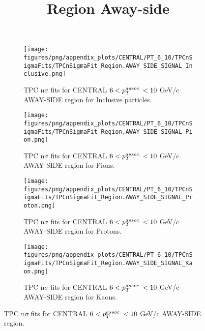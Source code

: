             \begin{figure}[H]
                \title{Region Away-side}
                \begin{subfigure}[b]{0.5\textwidth}
                    \centering
                    \texttt{[image: figures/png/appendix\_plots/CENTRAL/PT\_6\_10/TPCnSigmaFits/TPCnSigmaFit\_Region.AWAY\_SIDE\_SIGNAL\_Inclusive.png]}
                    \caption{TPC n$\sigma$ fits for CENTRAL $6 < \pTassoc < 10$ GeV/c AWAY-SIDE region for Inclusive particles.}
                    \label{fig:appendix_CENTRAL_$6 < \pTassoc < 10$ GeV/c_AWAY_SIDE_SIGNAL_Inclusive}
                \end{subfigure}
                \begin{subfigure}[b]{0.5\textwidth}
                    \centering
                    \texttt{[image: figures/png/appendix\_plots/CENTRAL/PT\_6\_10/TPCnSigmaFits/TPCnSigmaFit\_Region.AWAY\_SIDE\_SIGNAL\_Pion.png]}
                    \caption{TPC n$\sigma$ fits for CENTRAL $6 < \pTassoc < 10$ GeV/c AWAY-SIDE region for Pions.}
                    \label{fig:appendix_CENTRAL_$6 < \pTassoc < 10$ GeV/c_AWAY_SIDE_SIGNAL_Pion}
                \end{subfigure}
                \begin{subfigure}[b]{0.5\textwidth}
                    \centering
                    \texttt{[image: figures/png/appendix\_plots/CENTRAL/PT\_6\_10/TPCnSigmaFits/TPCnSigmaFit\_Region.AWAY\_SIDE\_SIGNAL\_Proton.png]}
                    \caption{TPC n$\sigma$ fits for CENTRAL $6 < \pTassoc < 10$ GeV/c AWAY-SIDE region for Protons.}
                    \label{fig:appendix_CENTRAL_$6 < \pTassoc < 10$ GeV/c_AWAY_SIDE_SIGNAL_Proton}
                \end{subfigure}
                \begin{subfigure}[b]{0.5\textwidth}
                    \centering
                    \texttt{[image: figures/png/appendix\_plots/CENTRAL/PT\_6\_10/TPCnSigmaFits/TPCnSigmaFit\_Region.AWAY\_SIDE\_SIGNAL\_Kaon.png]}
                    \caption{TPC n$\sigma$ fits for CENTRAL $6 < \pTassoc < 10$ GeV/c AWAY-SIDE region for Kaons.}
                    \label{fig:appendix_CENTRAL_$6 < \pTassoc < 10$ GeV/c_AWAY_SIDE_SIGNAL_Kaon}
                \end{subfigure}
                \caption{TPC n$\sigma$ fits for CENTRAL $6 < \pTassoc < 10$ GeV/c AWAY-SIDE region.}
                \label{fig:appendix_CENTRAL_$6 < \pTassoc < 10$ GeV/c_AWAY_SIDE_SIGNAL}
            \end{figure}
